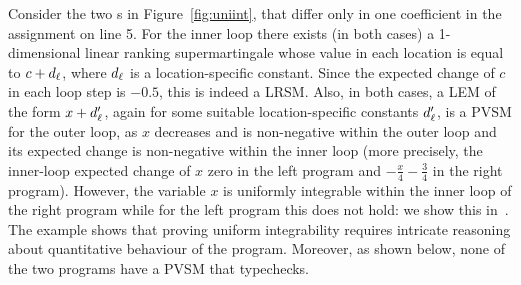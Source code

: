 \begin{example}
\label{ex:uniform}
\label{EX:UNIFORM}
Consider the two \APP{}s in Figure~\ref{fig:uniint}, that differ only in one 
coefficient in the 
assignment on line 5. For the inner loop there exists (in both cases) a 
1-dimensional linear ranking supermartingale whose value in each location is 
equal to $c+d_{\ell}$, where $d_{\ell}$ is a location-specific constant. Since 
the expected change of $c$ in each loop step is $-0.5$, this is indeed a LRSM. 
Also, in both cases, a LEM of the form $x+d_{\ell}'$, again for some suitable 
location-specific constants $d_{\ell}'$, is a PVSM for the outer loop, as $x$ 
decreases and is non-negative within the outer loop and its expected change is 
non-negative within the inner loop (more precisely, the inner-loop expected 
change of $x$ zero in the left program and $-\frac{x}{4} - \frac{3}{4}$ in the 
right 
program). 
However, the variable $x$ is uniformly integrable within the inner loop of the 
right program while for the left program this does not hold: we show this 
in~\AppendixMaterial. The example shows that proving uniform integrability 
requires intricate reasoning about quantitative behaviour of the program. 
Moreover, as shown below, none of the two programs have a PVSM that typechecks.

\end{example}

